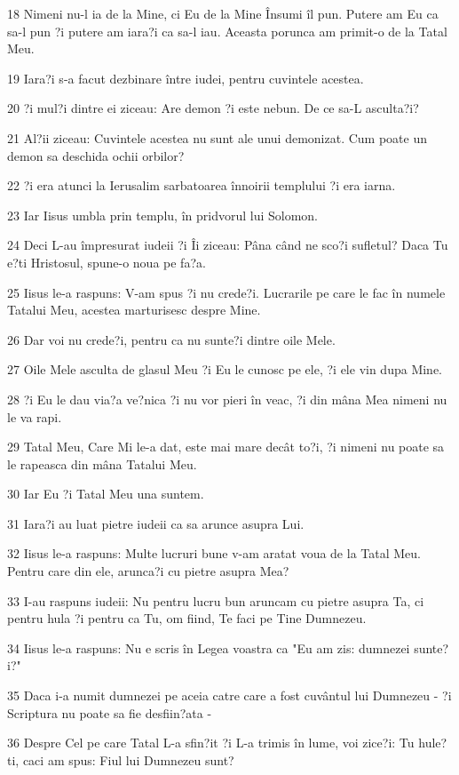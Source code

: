 \par 18 Nimeni nu-l ia de la Mine, ci Eu de la Mine Însumi îl pun. Putere am Eu ca sa-l pun ?i putere am iara?i ca sa-l iau. Aceasta porunca am primit-o de la Tatal Meu.
\par 19 Iara?i s-a facut dezbinare între iudei, pentru cuvintele acestea.
\par 20 ?i mul?i dintre ei ziceau: Are demon ?i este nebun. De ce sa-L asculta?i?
\par 21 Al?ii ziceau: Cuvintele acestea nu sunt ale unui demonizat. Cum poate un demon sa deschida ochii orbilor?
\par 22 ?i era atunci la Ierusalim sarbatoarea înnoirii templului ?i era iarna.
\par 23 Iar Iisus umbla prin templu, în pridvorul lui Solomon.
\par 24 Deci L-au împresurat iudeii ?i Îi ziceau: Pâna când ne sco?i sufletul? Daca Tu e?ti Hristosul, spune-o noua pe fa?a.
\par 25 Iisus le-a raspuns: V-am spus ?i nu crede?i. Lucrarile pe care le fac în numele Tatalui Meu, acestea marturisesc despre Mine.
\par 26 Dar voi nu crede?i, pentru ca nu sunte?i dintre oile Mele.
\par 27 Oile Mele asculta de glasul Meu ?i Eu le cunosc pe ele, ?i ele vin dupa Mine.
\par 28 ?i Eu le dau via?a ve?nica ?i nu vor pieri în veac, ?i din mâna Mea nimeni nu le va rapi.
\par 29 Tatal Meu, Care Mi le-a dat, este mai mare decât to?i, ?i nimeni nu poate sa le rapeasca din mâna Tatalui Meu.
\par 30 Iar Eu ?i Tatal Meu una suntem.
\par 31 Iara?i au luat pietre iudeii ca sa arunce asupra Lui.
\par 32 Iisus le-a raspuns: Multe lucruri bune v-am aratat voua de la Tatal Meu. Pentru care din ele, arunca?i cu pietre asupra Mea?
\par 33 I-au raspuns iudeii: Nu pentru lucru bun aruncam cu pietre asupra Ta, ci pentru hula ?i pentru ca Tu, om fiind, Te faci pe Tine Dumnezeu.
\par 34 Iisus le-a raspuns: Nu e scris în Legea voastra ca "Eu am zis: dumnezei sunte?i?"
\par 35 Daca i-a numit dumnezei pe aceia catre care a fost cuvântul lui Dumnezeu - ?i Scriptura nu poate sa fie desfiin?ata -
\par 36 Despre Cel pe care Tatal L-a sfin?it ?i L-a trimis în lume, voi zice?i: Tu hule?ti, caci am spus: Fiul lui Dumnezeu sunt?
